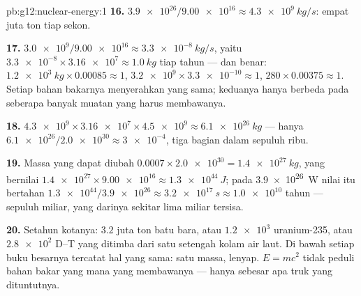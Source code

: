 \begin{solution}{pb:g12:nuclear-energy:1}
\textbf{16.} $\num{3.9e26}/\num{9.00e16} \approx \qty{4.3e9}{kg/s}$:
empat juta ton tiap sekon.

\textbf{17.} $\num{3.0e9}/\num{9.00e16} \approx \qty{3.3e-8}{kg/s}$,
yaitu $\num{3.3e-8} \times \num{3.16e7} \approx \qty{1.0}{kg}$ tiap tahun
--- dan benar: $\qty{1.2e3}{kg} \times 0.00085 \approx 1$, $\num{3.2e9}
\times \num{3.3e-10} \approx 1$, $280 \times 0.00375 \approx 1$. Setiap
bahan bakarnya menyerahkan  yang sama; keduanya hanya berbeda pada seberapa banyak muatan
yang harus membawanya.

\textbf{18.} $\num{4.3e9} \times \num{3.16e7} \times \num{4.5e9}
\approx \qty{6.1e26}{kg}$ --- hanya $\num{6.1e26}/\num{2.0e30} \approx
\num{3e-4}$, tiga bagian dalam sepuluh ribu.

\textbf{19.} Massa yang dapat diubah $0.0007 \times \num{2.0e30} =
\qty{1.4e27}{kg}$, yang bernilai $\num{1.4e27} \times \num{9.00e16} \approx
\qty{1.3e44}{J}$; pada \qty{3.9e26}{W} nilai itu bertahan $\num{1.3e44}/
\num{3.9e26} \approx \qty{3.2e17}{s} \approx \num{1.0e10}$ tahun ---
sepuluh miliar, yang darinya sekitar lima miliar tersisa.

\textbf{20.} Setahun kotanya: $3.2$ juta ton batu bara, atau
$\num{1.2e3}$  uranium-235, atau $\num{2.8e2}$ 
D--T yang ditimba dari satu setengah kolam air laut. Di bawah setiap buku besarnya
tercatat hal yang sama: satu  massa, lenyap. $E = mc^2$ tidak peduli bahan bakar
yang mana yang membawanya --- hanya sebesar apa truk yang dituntutnya.
\end{solution}
